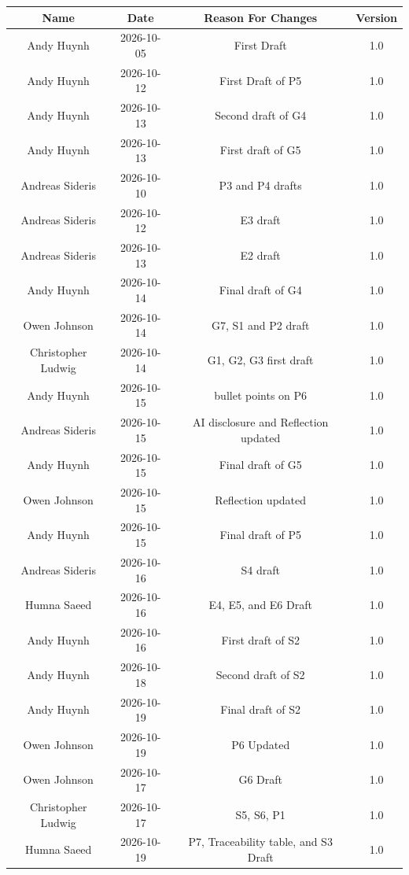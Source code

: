 \documentclass{scrreprt}
\theoremstyle{definition}
\begin{document}
	\begin{center}
		\begin{tabular}{|c|c|c|c|}
			\hline
			Name        & Date          & Reason For Changes & Version\\
			\hline
			\hline
			Andy Huynh & 2026-10-05 & First Draft & 1.0 \\
			\hline
			Andy Huynh & 2026-10-12 & First Draft of P5 & 1.0 \\
			\hline
			Andy Huynh & 2026-10-13 & Second draft of G4 & 1.0 \\
			\hline
			Andy Huynh & 2026-10-13 & First draft of G5 & 1.0 \\
			\hline
			
			Andreas Sideris & 2026-10-10    & P3 and P4 drafts & 1.0\\
			\hline
			Andreas Sideris & 2026-10-12    & E3 draft & 1.0\\
			\hline
			Andreas Sideris & 2026-10-13    & E2 draft & 1.0\\
			\hline
			Andy Huynh & 2026-10-14 & Final draft of G4 & 1.0 \\
			\hline
			Owen Johnson & 2026-10-14    & G7, S1 and P2 draft & 1.0\\
      \hline
	  		Christopher Ludwig & 2026-10-14 & G1, G2, G3 first draft &1.0\\
			\hline
			Andy Huynh & 2026-10-15 & bullet points on P6 & 1.0 \\
			\hline
			Andreas Sideris & 2026-10-15    & AI disclosure and Reflection 
			updated & 1.0\\
			\hline
			Andy Huynh & 2026-10-15 & Final draft of G5 & 1.0 \\
			\hline
			Owen Johnson & 2026-10-15    & Reflection updated & 1.0\\
			\hline
			Andy Huynh & 2026-10-15 & Final draft of P5 & 1.0 \\
			\hline
			
			Andreas Sideris & 2026-10-16    & S4 draft & 1.0\\
      \hline
			Humna Saeed & 2026-10-16    & E4, E5, and E6 Draft & 1.0\\
			\hline
			Andy Huynh & 2026-10-16 & First draft of S2 & 1.0 \\
			\hline
			Andy Huynh & 2026-10-18 & Second draft of S2 & 1.0 \\
			\hline
			Andy Huynh & 2026-10-19 & Final draft of S2 & 1.0 \\
			\hline
			Owen Johnson & 2026-10-19    & P6 Updated & 1.0\\
			Owen Johnson & 2026-10-17    & G6 Draft & 1.0\\
			\hline
			Christopher Ludwig & 2026-10-17 & S5, S6, P1 & 1.0\\
			\hline
			Humna Saeed & 2026-10-19   & P7, Traceability table, and S3 Draft & 1.0\\
      	\hline
		\end{tabular}
	\end{center}
	
\end{document}
